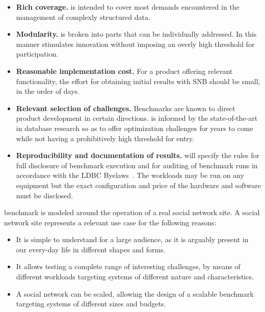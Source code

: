 \begin{itemize}
 \item \textbf{Rich coverage.} \ldbcsnb is intended to cover most demands
     encountered in the management of complexly structured data.
 \item \textbf{Modularity.} \ldbcsnb is broken into parts that can be
     individually addressed. In this manner \ldbcsnb
     stimulates innovation without imposing an overly high threshold for
     participation.
 \item \textbf{Reasonable implementation cost.} For a product offering relevant
     functionality, the effort for obtaining initial results with SNB should be
     small, in the order of days.
 \item \textbf{Relevant selection of challenges.} Benchmarks are known to
     direct product development in certain directions. \ldbcsnb is informed by
     the state-of-the-art in database research so as to offer optimization
     challenges for years to come while not having a prohibitively high
     threshold for entry.
 \item \textbf{Reproducibility and documentation of results.} \ldbcsnb
     will specify the rules for full disclosure of benchmark execution and for
     auditing of benchmark runs in accordance with the LDBC Byelaws~\cite{ldbc_byelaws}.
     The workloads may be run on any equipment
     but the exact configuration and price of the hardware and software must be
     disclosed.
\end{itemize}

\ldbcsnb benchmark is modeled around the operation of a real social network
site. A social network site represents a relevant use case for the following
reasons:

\begin{itemize}
    \item It is simple to understand for a large audience, as it is
        arguably present in our every-day life in different shapes and forms.
    \item It allows testing a complete range of interesting
        challenges, by means of different workloads targeting systems of
        different nature and characteristics.
    \item A social network can be scaled, allowing the design of a
        scalable benchmark targeting systems of different sizes and budgets.
\end{itemize}

